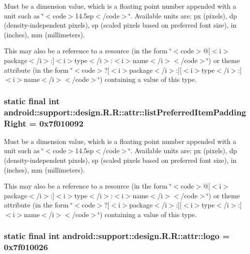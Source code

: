 Must be a dimension value, which is a floating point number appended with a unit such as \char`\"{}$<$code$>$14.5sp$<$/code$>$\char`\"{}. Available units are: px (pixels), dp (density-independent pixels), sp (scaled pixels based on preferred font size), in (inches), mm (millimeters). 

This may also be a reference to a resource (in the form \char`\"{}$<$code$>$@\mbox{[}$<$i$>$package$<$/i$>$:\mbox{]}$<$i$>$type$<$/i$>$:$<$i$>$name$<$/i$>$$<$/code$>$\char`\"{}) or theme attribute (in the form \char`\"{}$<$code$>$?\mbox{[}$<$i$>$package$<$/i$>$:\mbox{]}\mbox{[}$<$i$>$type$<$/i$>$:\mbox{]}$<$i$>$name$<$/i$>$$<$/code$>$\char`\"{}) containing a value of this type. \hypertarget{classandroid_1_1support_1_1design_1_1_r_1_1attr_ca8012ac6d5c11a83f82fa2ac09618d7}{
\subsubsection[{listPreferredItemPaddingRight}]{\setlength{\rightskip}{0pt plus 5cm}static final int android::support::design.R.R::attr::listPreferredItemPaddingRight = 0x7f010092}}
\label{classandroid_1_1support_1_1design_1_1_r_1_1attr_ca8012ac6d5c11a83f82fa2ac09618d7}


Must be a dimension value, which is a floating point number appended with a unit such as \char`\"{}$<$code$>$14.5sp$<$/code$>$\char`\"{}. Available units are: px (pixels), dp (density-independent pixels), sp (scaled pixels based on preferred font size), in (inches), mm (millimeters). 

This may also be a reference to a resource (in the form \char`\"{}$<$code$>$@\mbox{[}$<$i$>$package$<$/i$>$:\mbox{]}$<$i$>$type$<$/i$>$:$<$i$>$name$<$/i$>$$<$/code$>$\char`\"{}) or theme attribute (in the form \char`\"{}$<$code$>$?\mbox{[}$<$i$>$package$<$/i$>$:\mbox{]}\mbox{[}$<$i$>$type$<$/i$>$:\mbox{]}$<$i$>$name$<$/i$>$$<$/code$>$\char`\"{}) containing a value of this type. \hypertarget{classandroid_1_1support_1_1design_1_1_r_1_1attr_064f483000345b55e4e15845a60fb834}{
\subsubsection[{logo}]{\setlength{\rightskip}{0pt plus 5cm}static final int android::support::design.R.R::attr::logo = 0x7f010026}}
\label{classandroid_1_1support_1_1design_1_1_r_1_1attr_064f483000345b55e4e15845a60fb834}


